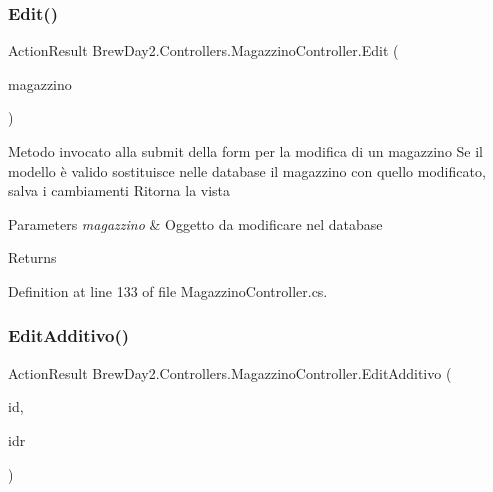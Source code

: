 \subsubsection{\texorpdfstring{Edit()}{Edit()}\hspace{0.1cm}{\footnotesize\ttfamily [2/2]}}
{\footnotesize\ttfamily Action\+Result Brew\+Day2.\+Controllers.\+Magazzino\+Controller.\+Edit (\begin{DoxyParamCaption}\item[{\mbox{[}\+Bind(\+Include = \char`\"{}\+Magazzino\+Id,\+User\+Id\char`\"{})\mbox{]} \mbox{\hyperlink{class_brew_day2_1_1_models_1_1_magazzino}{Magazzino}}}]{magazzino }\end{DoxyParamCaption})}



Metodo invocato alla submit della form per la modifica di un magazzino Se il modello è valido sostituisce nelle database il magazzino con quello modificato, salva i cambiamenti Ritorna la vista 


\begin{DoxyParams}{Parameters}
{\em magazzino} & Oggetto da modificare nel database\\
\hline
\end{DoxyParams}
\begin{DoxyReturn}{Returns}

\end{DoxyReturn}


Definition at line 133 of file Magazzino\+Controller.\+cs.

\mbox{\label{class_brew_day2_1_1_controllers_1_1_magazzino_controller_af8a9e46f0163c13ee2fdbd51bcc9e445}} 
\subsubsection{\texorpdfstring{Edit\+Additivo()}{EditAdditivo()}\hspace{0.1cm}{\footnotesize\ttfamily [1/2]}}
{\footnotesize\ttfamily Action\+Result Brew\+Day2.\+Controllers.\+Magazzino\+Controller.\+Edit\+Additivo (\begin{DoxyParamCaption}\item[{int}]{id,  }\item[{int}]{idr }\end{DoxyParamCaption})}



